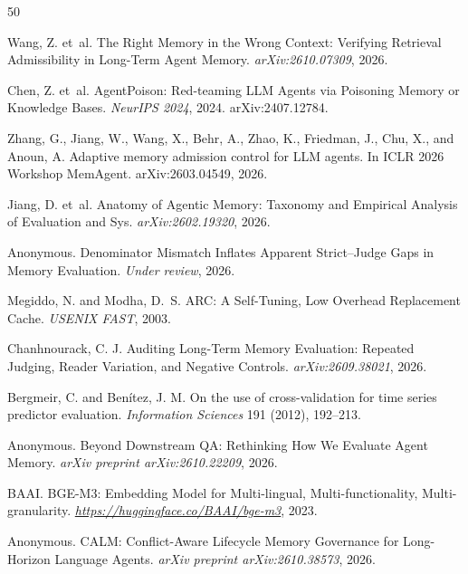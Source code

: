 \documentclass[sigconf,nonacm]{acmart}
\begin{document}
\begin{thebibliography}{50}

Wang, Z. et~al.
\newblock The Right Memory in the Wrong Context: Verifying Retrieval Admissibility in Long-Term Agent Memory.
\newblock \emph{arXiv:2610.07309}, 2026.

Chen, Z. et~al.
\newblock AgentPoison: Red-teaming LLM Agents via Poisoning Memory or Knowledge Bases.
\newblock \emph{NeurIPS 2024}, 2024. arXiv:2407.12784.

Zhang, G., Jiang, W., Wang, X., Behr, A., Zhao, K., Friedman, J., Chu, X., and Anoun, A.
Adaptive memory admission control for LLM agents. In ICLR 2026 Workshop MemAgent.
arXiv:2603.04549, 2026.

Jiang, D. et~al.
\newblock Anatomy of Agentic Memory: Taxonomy and Empirical Analysis of Evaluation and Sys. \newblock \emph{arXiv:2602.19320}, 2026.

Anonymous.
\newblock Denominator Mismatch Inflates Apparent Strict--Judge Gaps in Memory Evaluation.
\newblock \emph{Under review}, 2026.

Megiddo, N. and Modha, D.~S.
\newblock ARC: A Self-Tuning, Low Overhead Replacement Cache.
\newblock \emph{USENIX FAST}, 2003.

Chanhnourack, C. J.
\newblock Auditing Long-Term Memory Evaluation: Repeated Judging, Reader Variation, and Negative Controls.
\newblock \emph{arXiv:2609.38021}, 2026.

Bergmeir, C. and Benítez, J. M. On the use of cross-validation for time series predictor evaluation. \emph{Information Sciences} 191 (2012), 192--213.

Anonymous.
\newblock Beyond Downstream QA: Rethinking How We Evaluate Agent Memory.
\newblock \emph{arXiv preprint arXiv:2610.22209}, 2026.

BAAI.
\newblock BGE-M3: Embedding Model for Multi-lingual, Multi-functionality, Multi-granularity.
\newblock \emph{\url{https://huggingface.co/BAAI/bge-m3}}, 2023.

Anonymous.
\newblock CALM: Conflict-Aware Lifecycle Memory Governance for Long-Horizon Language Agents.
\newblock \emph{arXiv preprint arXiv:2610.38573}, 2026.


\end{thebibliography}
\end{document}

